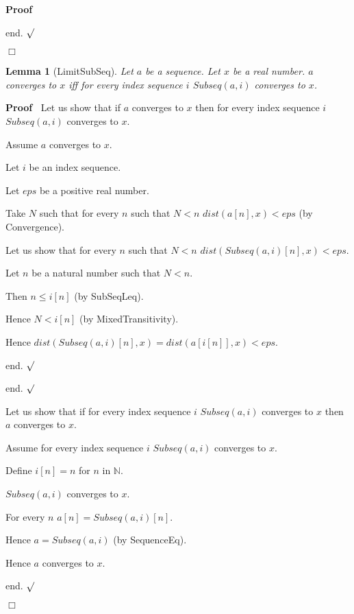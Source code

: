 \documentclass{article}
\newenvironment{forthel}{\begin{leftbar}}{\end{leftbar}}
\newenvironment{proof}{\noindent\textbf{Proof\ }}{\hspace*{\fill}$\Box$\medskip}
\newenvironment{subproof}{\begin{list}{}{}
		\item[\text{Proof}]}{\hfill $\surd$ \end{list}}
\newtheorem{lemma}{Lemma}
\newcommand{\NN}{\mathbb{N}}
\begin{document}
\begin{forthel}
\begin{proof}
\begin{subproof}
		end.
		\end{subproof}
	\end{proof}
	
	\begin{lemma}[LimitSubSeq]
		Let $a$ be a sequence. Let $x$ be a real number. $a$ converges to $x$ iff for every index sequence $i$ $Subseq(a,i)$ converges to $x$. 
	\end{lemma}
	\begin{proof}
		Let us show that if $a$ converges to $x$ then for every index sequence $i$ $Subseq(a,i)$ converges to $x$.
		
		\begin{subproof}
			Assume $a$ converges to $x$.
			
			Let $i$ be an index sequence.
			
			Let $eps$ be a positive real number.
			
			Take $N$ such that for every $n$ such that $N < n$ $dist(a[n],x) < eps$ (by Convergence).
			
			Let us show that for every $n$ such that $N < n$ $dist(Subseq(a,i)[n],x) < eps$.
			
			\begin{subproof}
				Let $n$ be a natural number such that $N < n$.
				
				Then $n \leq i[n]$ (by SubSeqLeq). 
				
				Hence $N < i[n]$ (by MixedTransitivity).
				
				Hence $dist(Subseq(a,i)[n],x) = dist(a[i[n]],x) < eps$.
				
				end.
			\end{subproof}
			
			end.
		\end{subproof}
		
		Let us show that if for every index sequence $i$ $Subseq(a,i)$ converges to $x$ then $a$ converges to $x$.
		
		\begin{subproof}
			Assume for every index sequence $i$ $Subseq(a,i)$ converges to $x$.
			
			Define $i[n] = n$ for $n$ in $\NN$.
			
			$Subseq(a,i)$ converges to $x$.
			
			For every $n$ $a[n] = Subseq(a,i)[n]$.
			
			Hence $a = Subseq(a,i)$ (by SequenceEq).
			
			Hence $a$ converges to $x$.
			
			end.
		\end{subproof}
	\end{proof}
	

\end{forthel}
\end{document}
